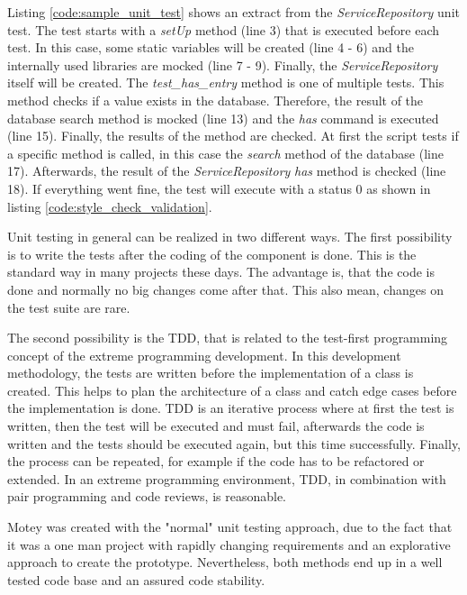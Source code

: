 Listing \ref{code:sample_unit_test} shows an extract from the \textit{ServiceRepository} unit test.
The test starts with a \textit{setUp} method (line 3) that is executed before each test.
In this case, some static variables will be created (line 4 - 6) and the internally used libraries are mocked (line 7 - 9).
Finally, the \textit{ServiceRepository} itself will be created.
The \textit{test\_has\_entry} method is one of multiple tests.
This method checks if a value exists in the database.
Therefore, the result of the database search method is mocked (line 13) and the \textit{has} command is executed (line 15).
Finally, the results of the method are checked.
At first the script tests if a specific method is called, in this case the \textit{search} method of the database (line 17).
Afterwards, the result of the \textit{ServiceRepository} \textit{has} method is checked (line 18).
If everything went fine, the test will execute with a status 0 as shown in listing \ref{code:style_check_validation}.\newline

Unit testing in general can be realized in two different ways.
The first possibility is to write the tests after the coding of the component is done.
This is the standard way in many projects these days.
The advantage is, that the code is done and normally no big changes come after that.
This also mean, changes on the test suite are rare.\newline

The second possibility is the \ac{TDD}, that is related to the test-first programming concept of the extreme programming development.
In this development methodology, the tests are written before the implementation of a class is created.
This helps to plan the architecture of a class and catch edge cases before the implementation is done.
\ac{TDD} is an iterative process where at first the test is written, then the test will be executed and must fail, afterwards the code is written and the tests should be executed again, but this time successfully.
Finally, the process can be repeated, for example if the code has to be refactored or extended.
In an extreme programming environment, \ac{TDD}, in combination with pair programming and code reviews, is reasonable.\newline

Motey was created with the "normal" unit testing approach, due to the fact that it was a one man project with rapidly changing requirements and an explorative approach to create the prototype.
Nevertheless, both methods end up in a well tested code base and an assured code stability.
